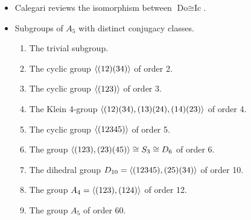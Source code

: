 \documentclass[../notes.tex]{subfiles}
\begin{document}
\begin{itemize}
\begin{proof}
\begin{align*}
            \phi(gH) &= \phi(g'H)\\
            g\cdot x &= g'\cdot x
        \end{align*}
        so $g^{-1}g'\in\Stab(x)=H$. But this implies that $g'=gh$ for some $h\in H$, meaning that
        \begin{equation*}
            g'H = ghH = gH
        \end{equation*}
        as desired. For surjectivity, since $G\acts X$ is transitive, there exists $g\in G$ for which $g\cdot x=x'$ for all $x'\in X$. Therefore, for any $x'\in X$, $gH\in G/H$ satisfies
        \begin{equation*}
            \phi(gH) = g\cdot x = x'
        \end{equation*}
        as desired. To confirm that $\phi$ preserves the group action, it will suffice to verify that $\phi(\gamma\cdot gH)=\gamma\cdot\phi(gH)$ for all $\gamma\in G$ and $gH\in G/H$. Let $\gamma\in G$ and $gH\in G/H$ be arbitrary. Then
        \begin{equation*}
            \phi(\gamma\cdot gH) = \phi(\gamma gH)
            = \gamma g\cdot x
            = \gamma\cdot(g\cdot x)
            = \gamma\cdot\phi(gH)
        \end{equation*}
        as desired.
    \end{proof}
    \item Calegari reviews the isomorphism between $\text{Do}\cong\text{Ic}$.
    \item Subgroups of $A_5$ with distinct conjugacy classes.
    \begin{enumerate}
        \item The trivial subgroup.
        \item The cyclic group $\left\langle{(12)(34)}\right\rangle$ of order 2.
        \item The cyclic group $\left\langle{(123)}\right\rangle$ of order 3.
        \item The Klein 4-group $\left\langle{(12)(34),(13)(24),(14)(23)}\right\rangle$ of order 4.
        \item The cyclic group $\left\langle{(12345)}\right\rangle$ of order 5.
        \item The group $\left\langle{(123),(23)(45)}\right\rangle\cong S_3\cong D_6$ of order 6.
        \item The dihedral group $D_{10}=\left\langle{(12345),(25)(34)}\right\rangle$ of order 10.
        \item The group $A_4=\left\langle{(123),(124)}\right\rangle$ of order 12.
        \item The group $A_5$ of order 60.
    \end{enumerate}

\end{itemize}
\end{document}
